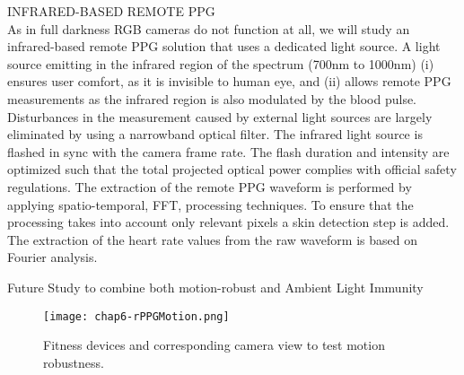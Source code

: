 \begin{compactitem}
\item {INFRARED-BASED REMOTE PPG}\\
As in full darkness RGB cameras do not function at all, we will study
an infrared-based remote PPG solution that uses a dedicated light source.
A light source emitting in the infrared region of the spectrum
(700nm to 1000nm) (i) ensures user comfort, as it is invisible to human
eye, and (ii) allows remote PPG measurements as the infrared region is
also modulated by the blood pulse.  Disturbances in the measurement caused
by external light sources are largely eliminated by using a narrowband
optical filter. The infrared light source is flashed in sync with the
camera frame rate. The flash duration and intensity are optimized such
that the total projected optical power complies with official safety
regulations. The extraction of the remote PPG waveform is performed by applying
spatio-temporal,  FFT, processing techniques.
To ensure that the processing takes into account only relevant pixels a
skin detection step is added. The extraction of the heart rate values from
the raw waveform is based on Fourier analysis.\cite{rPPG7005489}

\item{Future Study to combine both motion-robust and Ambient Light Immunity}

\begin{figure}[h]
  \centering
    \texttt{[image: chap6-rPPGMotion.png]}
  \caption{Fitness devices and corresponding camera view to test motion robustness.}
  \label{fig:chap6-rPPGMotion}
\end{figure} \cite{rPPGPubMed}

\end{compactitem}
